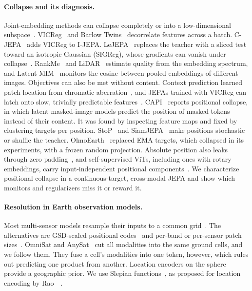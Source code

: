 \paragraph{Collapse and its diagnosis.} Joint-embedding methods can collapse completely or into a low-dimensional subspace~\cite{jing2022understanding,hua2021feature,tian2021understanding}. VICReg~\cite{bardes2022vicreg} and Barlow Twins~\cite{zbontar2021barlow} decorrelate features across a batch. C-JEPA~\cite{mo2024connecting} adds VICReg to I-JEPA. LeJEPA~\cite{balestriero2025lejepa} replaces the teacher with a sliced test toward an isotropic Gaussian (SIGReg), whose gradients can vanish under collapse~\cite{wu2026visreg}. RankMe~\cite{garrido2023rankme} and LiDAR~\cite{thilak2024lidar} estimate quality from the embedding spectrum, and Latent MIM~\cite{wei2024towards} monitors the cosine between pooled embeddings of different images. Objectives can also be met without content. Context prediction learned patch location from chromatic aberration~\cite{doersch2015unsupervised}, and JEPAs trained with VICReg can latch onto slow, trivially predictable features~\cite{sobal2022joint}. CAPI~\cite{darcet2025cluster} reports positional collapse, in which latent masked-image models predict the position of masked tokens instead of their content. It was found by inspecting feature maps and fixed by clustering targets per position. StoP~\cite{bar2024stochastic} and SiamJEPA~\cite{yamada2026siamjepa} make positions stochastic or shuffle the teacher. OlmoEarth~\cite{herzog2026olmoearth} replaced EMA targets, which collapsed in its experiments, with a frozen random projection. Absolute position also leaks through zero padding~\cite{islam2020much,kayhan2020translation,chu2023conditional}, and self-supervised ViTs, including ones with rotary embeddings, carry input-independent positional components~\cite{pawlowsky2026dino,yang2024denoising}. We characterize positional collapse in a continuous-target, cross-modal JEPA and show which monitors and regularizers miss it or reward it.

\paragraph{Resolution in Earth observation models.} Most multi-sensor models resample their inputs to a common grid~\cite{fuller2023croma,xiong2024neural,jakubik2025terramind,tseng2025galileo}. The alternatives are GSD-scaled positional codes~\cite{reed2023scale,irvin2023usat,forgaard2026thor} and per-band or per-sensor patch sizes~\cite{irvin2023usat,wang2025towards}. OmniSat and AnySat~\cite{astruc2024omnisat,astruc2025anysat} cut all modalities into the same ground cells, and we follow them. They fuse a cell's modalities into one token, however, which rules out predicting one product from another. Location encoders on the sphere~\cite{mai2020multi,klemmer2025satclip,vivancocepeda2023geoclip,russwurm2024geographic} provide a geographic prior. We use Slepian functions~\cite{simons2006spatiospectral}, as proposed for location encoding by Rao~\etal~\cite{rao2026localized}.

